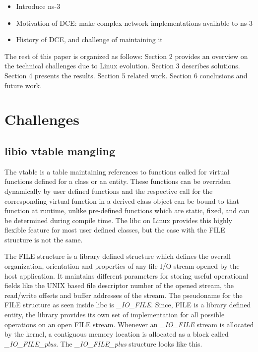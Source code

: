 \documentclass{sig-alternate}
\begin{document}
\begin{itemize}
\item Introduce ns-3
\item Motivation of DCE: make complex network implementations available to ns-3
\item History of DCE, and challenge of maintaining it
\end{itemize}

The rest of this paper is organized as follows: Section 2 provides an overview on the technical challenges due to Linux evolution.
Section 3 describes solutions.
Section 4 presents the results.  Section 5 related work.  Section 6 conclusions
and future work.

\section{Challenges}

\subsection{libio vtable mangling}
The vtable is a table maintaining references to functions called for virtual functions defined for a class or an entity. These functions can 
be overriden dynamically by user defined functions and the respective call for the corresponding virtual function in a derived class object can be bound 
to that function at runtime, unlike pre-defined functions which are static, fixed, and can be determined during compile time. The libc on Linux provides
this highly flexible feature for most user defined classes, but the case with the FILE structure is not the same.

The FILE structure is a library defined structure which defines the overall organization, orientation and properties of any file I/O stream opened
by the host application. It maintains different parameters for storing useful operational fields like the UNIX based file descriptor number of the 
opened stream, the read/write offsets and buffer addresses of the stream. The pseudoname for the FILE structure as seen inside libc is \textit{\_IO\_FILE}. 
Since, FILE is a library defined entity, the library provides its own set of implementation for all possible operations on an open FILE stream.
Whenever an \textit{\_IO\_FILE} stream is allocated by the kernel, a contiguous memory location is allocated as a block called \textit{\_IO\_FILE\_plus}. 
The \textit{\_IO\_FILE\_plus} structure looks like this.
\end{document}
